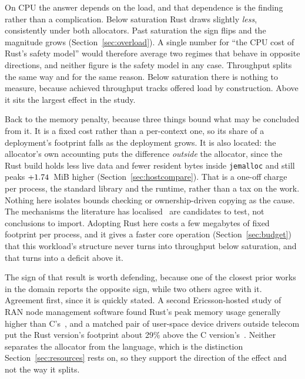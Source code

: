 \documentclass[english,oneside,a4paper,censored,csm,software-track-2020]{HYthesisML}
\begin{document}
On CPU the answer depends on the load, and that dependence is the finding rather than a
complication. Below saturation Rust draws slightly \emph{less}, consistently under both
allocators. Past saturation the sign flips and the magnitude grows
(Section~\ref{sec:overload}). A single number for ``the CPU cost of
Rust's safety model'' would therefore average two regimes that behave in opposite directions, and
neither figure is the safety model in any case. Throughput splits the same way and for the same
reason. Below saturation there is nothing to measure, because achieved throughput tracks offered
load by construction. Above it sits the largest effect in the study.

Back to the memory penalty, because three things bound what may be concluded from it. It is a fixed cost
rather than a per-context one, so its share of a deployment's footprint falls as the deployment
grows. It is also located: the allocator's own accounting puts the difference \emph{outside}
the allocator, since the Rust build holds less live data and fewer resident bytes inside
\texttt{jemalloc} and still peaks $+1.74$~MiB higher (Section~\ref{sec:hostcompare}).
That is a one-off charge per process, the standard library and the runtime, rather than a tax on
the work. Nothing here isolates bounds checking or ownership-driven copying as the cause.
The mechanisms the literature has localised~\cite{zhang2022runtime,harris2023morello} are
candidates to test, not conclusions to import. Adopting Rust here costs a few megabytes of
fixed footprint per process, and it gives a faster core operation (Section~\ref{sec:budget})
that this workload's structure never turns into throughput below saturation, and that turns
into a deficit above it.

The sign of that result is worth defending, because one of the closest prior works in the domain
reports the opposite sign, while two others agree with it. Agreement first, since it is quickly
stated. A second Ericsson-hosted study of RAN node management software found Rust's peak memory
usage generally higher than C's~\cite{olsson2023ranmgmt}, and a matched pair of user-space device
drivers outside telecom put the Rust version's footprint about 29\% above the C
version's~\cite{sundvisson2026drivers}. Neither separates the allocator from the language, which
is the distinction Section~\ref{sec:resources} rests on, so they support the direction of the
effect and not the way it splits.
\end{document}

